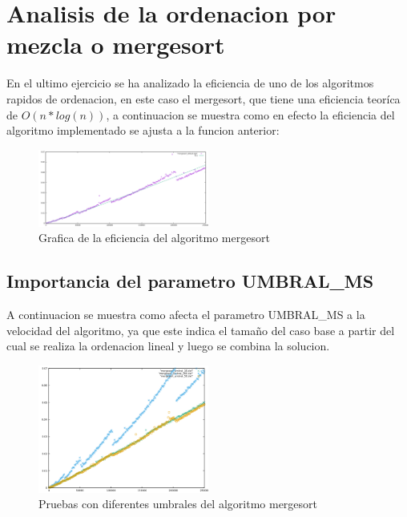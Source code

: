 \section{Analisis de la ordenacion por mezcla o mergesort}

En el ultimo ejercicio se ha analizado la eficiencia de uno de los algoritmos rapidos de ordenacion, en este caso el mergesort, que tiene una eficiencia teoríca de $O(n*log(n))$, a continuacion se muestra como en efecto la eficiencia del algoritmo implementado se ajusta a la funcion anterior:

\begin{figure}[ht]
  \centering
  \includegraphics[width=0.5\textwidth]{./Imagenes/mergesort_fit.png}
  \caption{Grafica de la eficiencia del algoritmo mergesort}
\end{figure}

\subsection{Importancia del parametro UMBRAL\_MS}

A continuacion se muestra como afecta el parametro UMBRAL\_MS a la velocidad del algoritmo, ya que este indica el tamaño del caso base a partir del cual se realiza la ordenacion lineal y luego se combina la solucion.

\begin{figure}[H]
  \centering
  \includegraphics[width=0.5\textwidth]{./Imagenes/mergesort_umbral.png}
  \caption{Pruebas con diferentes umbrales del algoritmo mergesort}
\end{figure}
